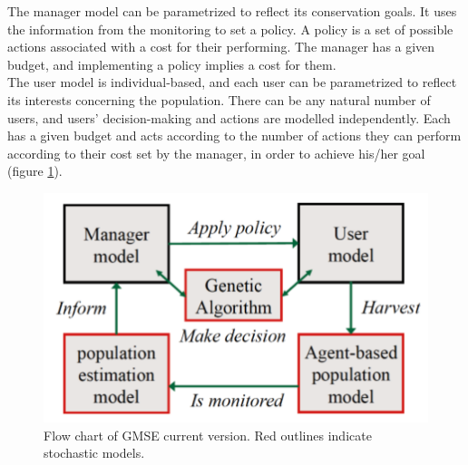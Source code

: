 \documentclass[12pt,a4paper]{article}
\begin{document}
The manager model can be parametrized to reflect its conservation goals. %
It uses the information from the monitoring to set a policy.
A policy is a set of possible actions associated with a cost for their performing. %
The manager has a given budget, and implementing a policy implies a cost for them.\\ %
The user model is individual-based, and each user can be parametrized to reflect its interests concerning the population.
There can be any natural number of users, and users' decision-making and actions are modelled independently.
Each has a given budget and acts according to the number of actions they can perform according to their cost set by the manager, in order to achieve his/her goal (figure \ref{gmse-diagram}). %
\begin{figure}
	\centering
	\includegraphics[scale=0.35]{gmse-diagram.png}
	\caption{Flow chart of GMSE current version. Red outlines indicate stochastic models.}
	\label{gmse-diagram}
\end{figure}
\end{document}
